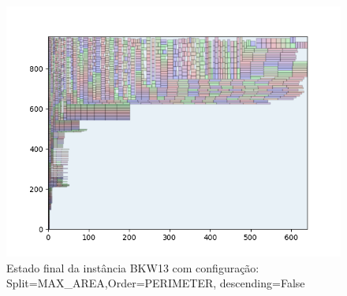 \begin{figure}[H]
    \centering
    \caption[]{Estado final da instância BKW13 com configuração: Split=MAX_AREA,Order=PERIMETER, descending=False}
    \label{fig:bkw13-max_area-perimeter-false}
    \includegraphics[scale=0.5]{output/figures/bkw/bkw13/max_area/perimeter/false/0000}
\end{figure}